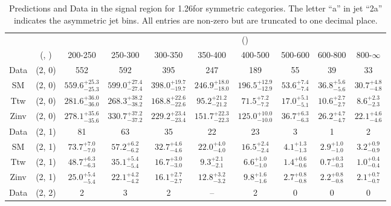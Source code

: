 \begin{table}[h!]
\tiny
\centering
\caption{Predictions and Data in the signal region for 1.26\ifb for symmetric categories. The letter ``a'' in jet \eg ``2a''  indicates the asymmetric jet bins. All entries are non-zero but are truncated to one decimal place.\label{tab:yieldsallpost_sig_comb_sym}}
\begin{tabular}
{cccccccccc}
	\hline\hline
&	&	& \multicolumn{8}{c}{\scalht (\gev)}\\ 
	&	 (\njet, \nb) & 200-250 & 250-300 & 300-350 & 350-400 & 400-500 & 500-600 & 600-800 & 800-$\infty$ \\ [0.8ex] 
\hline
	Data & (2, 0) & 552 & 592 & 395 & 247 & 189 & 55 & 39 & 33 \\[0.5ex] 
	SM & (2, 0) & $559.6^{+ 25.3 }_{- 25.3 }$ & $599.0^{+ 27.4 }_{- 27.4 }$ & $398.0^{+ 19.7 }_{- 19.7 }$ & $246.9^{+ 18.0 }_{- 18.0 }$ & $196.5^{+ 12.9 }_{- 12.9 }$ & $53.6^{+ 7.4 }_{- 7.4 }$ & $36.8^{+ 5.6 }_{- 5.6 }$ & $30.7^{+ 4.8 }_{- 4.8 }$ \\[0.5ex] 
	Ttw & (2, 0) & $281.6^{+ 36.0 }_{- 36.0 }$ & $268.3^{+ 38.2 }_{- 38.2 }$ & $168.8^{+ 22.6 }_{- 22.6 }$ & $95.2^{+ 21.2 }_{- 21.2 }$ & $71.5^{+ 7.2 }_{- 7.2 }$ & $17.0^{+ 5.1 }_{- 5.1 }$ & $10.6^{+ 2.7 }_{- 2.7 }$ & $8.6^{+ 2.3 }_{- 2.3 }$ \\[0.5ex] 
	Zinv & (2, 0) & $278.1^{+ 35.6 }_{- 35.6 }$ & $330.7^{+ 37.2 }_{- 37.2 }$ & $229.2^{+ 23.4 }_{- 23.4 }$ & $151.7^{+ 22.3 }_{- 22.3 }$ & $125.0^{+ 10.0 }_{- 10.0 }$ & $36.7^{+ 6.3 }_{- 6.3 }$ & $26.2^{+ 4.7 }_{- 4.7 }$ & $22.1^{+ 4.6 }_{- 4.6 }$ \\[0.5ex] 
	Data & (2, 1) & 81 & 63 & 35 & 22 & 23 & 3 & 1 & 2 \\[0.5ex] 
	SM & (2, 1) & $73.7^{+ 7.0 }_{- 7.0 }$ & $57.2^{+ 6.2 }_{- 6.2 }$ & $32.7^{+ 4.6 }_{- 4.6 }$ & $22.0^{+ 4.0 }_{- 4.0 }$ & $16.5^{+ 2.4 }_{- 2.4 }$ & $4.1^{+ 1.3 }_{- 1.3 }$ & $2.9^{+ 1.0 }_{- 1.0 }$ & $3.2^{+ 0.9 }_{- 0.9 }$ \\[0.5ex] 
	Ttw & (2, 1) & $48.7^{+ 6.3 }_{- 6.3 }$ & $35.1^{+ 5.4 }_{- 5.4 }$ & $16.7^{+ 3.0 }_{- 3.0 }$ & $9.3^{+ 2.1 }_{- 2.1 }$ & $6.6^{+ 1.0 }_{- 1.0 }$ & $1.4^{+ 0.6 }_{- 0.6 }$ & $0.7^{+ 0.3 }_{- 0.3 }$ & $1.0^{+ 0.4 }_{- 0.4 }$ \\[0.5ex] 
	Zinv & (2, 1) & $25.0^{+ 5.4 }_{- 5.4 }$ & $22.1^{+ 4.2 }_{- 4.2 }$ & $16.1^{+ 2.7 }_{- 2.7 }$ & $12.8^{+ 3.2 }_{- 3.2 }$ & $9.8^{+ 1.6 }_{- 1.6 }$ & $2.7^{+ 0.8 }_{- 0.8 }$ & $2.2^{+ 0.8 }_{- 0.8 }$ & $2.1^{+ 0.7 }_{- 0.7 }$ \\[0.5ex] 
	Data & (2, 2) & 2 & 3 & 2 & -- & 2 & 0 & 0 & 0 \\[0.5ex] 

\end{tabular}
\end{table}
